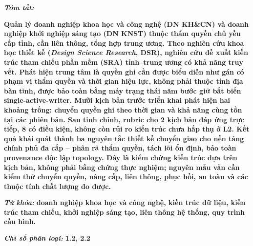 
\noindent\textbf{\textit{Tóm tắt:}}

\noindent
\textbf{Quản lý doanh nghiệp khoa học và công nghệ (DN KH\&CN) và doanh nghiệp khởi nghiệp sáng tạo (DN KNST) thuộc thẩm quyền chủ yếu cấp tỉnh, cần liên thông, tổng hợp trung ương. Theo nghiên cứu khoa học thiết kế (\textit{Design Science Research}, DSR), nghiên cứu đề xuất kiến trúc tham chiếu phần mềm (SRA) tỉnh--trung ương có khả năng truy vết. Phát hiện trung tâm là quyền ghi cần được biểu diễn như gán có phạm vi thẩm quyền và thời gian hiệu lực, không phải thuộc tính địa bàn tĩnh, được bảo toàn bằng máy trạng thái năm bước giữ bất biến single-active-writer. Mười kịch bản trước triển khai phát hiện hai khoảng trống: chuyển quyền ghi theo thời gian và khả năng cùng tồn tại các phiên bản. Sau tinh chỉnh, rubric cho 2 kịch bản đáp ứng trực tiếp, 8 có điều kiện, không còn rủi ro kiến trúc chưa hấp thụ ở L2. Kết quả khái quát thành ba nguyên tắc thiết kế chuyển giao cho nền tảng chính phủ đa cấp -- phân rã thẩm quyền, tách lõi ổn định, bảo toàn provenance độc lập topology. Đây là kiểm chứng kiến trúc dựa trên kịch bản, không phải bằng chứng thực nghiệm; nguyên mẫu vẫn cần kiểm thử chuyển quyền, nâng cấp, liên thông, phục hồi, an toàn và các thuộc tính chất lượng đo được.}

\vspace{0.4em}
\noindent\textbf{\textit{Từ khóa:}} \textbf{doanh nghiệp khoa học và công nghệ, kiến trúc dữ liệu, kiến trúc tham chiếu, khởi nghiệp sáng tạo, liên thông hệ thống, quy trình cấu hình.}

\vspace{0.2em}
\noindent\textbf{\textit{Chỉ số phân loại:}} \textbf{1.2, 2.2}

